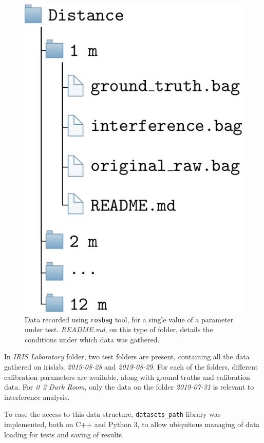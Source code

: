 \begin{figure}[!ht]
\centering
\includegraphics[scale=0.3]{img/datasets/parameter-test-files.png}
\caption[Dataset file hierarchy for a single value of a parameter under test.]{Data recorded using \texttt{rosbag} tool, for a single value of a parameter under test. \textit{README.md}, on this type of folder, details the conditions under which data was gathered.}
\label{fig:parameter-test-files}
\end{figure}


In \textit{IRIS Laboratory} folder, two test folders are present, containing all the data gathered on \ac{irislab}, \textit{2019-08-28} and \textit{2019-08-29}. For each of the folders, different calibration parameters are available, along with ground truths and calibration data. For \textit{\ac{it} 2 Dark Room}, only the data on the folder \textit{2019-07-31} is relevant to interference analysis.

To ease the access to this data structure, \texttt{datasets\_path} library was implemented, both on C++ and Python 3, to allow ubiquitous managing of data loading for tests and saving of results.


